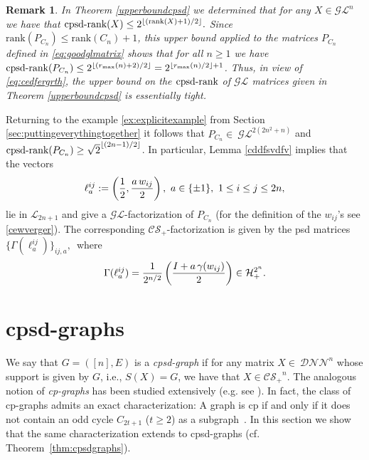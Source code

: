 \documentclass{siamart}
\newtheorem{remark}{Remark}[section]
\begin{document}
\begin{remark}\label{rem:tightlowerbound}
In Theorem
\ref{upperboundcpsd} we determined that for any $X\in {\mathcal{GL}}^n$ we have that
$ {\mathrm{cpsd}\textnormal{-rank}}(X)\le 2^{\lfloor ({\mathrm{rank}}(X)+1)/2\rfloor}.$ Since {${\mathrm{rank}}(P_{C_n})\le {\mathrm{rank}}(C_n) + 1  $}, this upper bound applied to the matrices $P_{C_n}$ defined in  \eqref{eq:goodglmatrix} shows that  for all $n\ge 1$ we have $  {\mathrm{cpsd}\textnormal{-rank}}(P_{C_n})\le {2^{\lfloor ({r_{\max}}(n)+2)/2\rfloor} = 2^{\lfloor {r_{\max}}(n)/2\rfloor + 1}}$.
Thus, in view of \eqref{eq:cedfergrth}, the upper bound on the ${\mathrm{cpsd}\textnormal{-rank}}$ of ${\mathcal{GL}}$ matrices given in Theorem \ref{upperboundcpsd} is essentially tight.
\end{remark}
\medskip

Returning  to the example \eqref{ex:explicitexample} from  Section \ref{sec:puttingeverythingtogether} it follows that  $P_{C_n}\in~{\mathcal{GL}}^{2(2n^2+n)}$ and   ${\mathrm{cpsd}\textnormal{-rank}}(P_{C_n})\ge {\sqrt{2}^{\lfloor (2n-1)/2 \rfloor}}$.
In particular, Lemma \ref{cddfsvdfv} implies that  the vectors
$$\ell^{ij}_a:=\left({1\over 2},{a \, w_{ij}\over 2}\right), \ a\in \{\pm 1\}, \ 1\le i\le j\le 2n,$$
lie in ${\mathcal{L}}_{2n+1}$ and  give a ${\mathcal{GL}}$-factorization  of $P_{C_n}$ (for the definition of the $w_{ij}$'s see \eqref{cewverger}).  The corresponding ${\mathcal{CS}_+}$-factorization is given by  the
{psd} matrices $\{\Gamma(\ell^{ij}_a)\}_{ij,a},$~{where}
$$\Gamma{(\ell^{ij}_a)}={1\over 2^{n/2}}\left ({I + a \, \gamma(w_{ij})\over 2}\right)\in {\mathcal{H}}_+^{2^n}.$$

\section{cpsd-graphs}\label{sec:cpsdgraphs}

We say that  $G=([n],E)
$  is  a  {\em cpsd-graph}   if for any matrix $X\in~{\mathcal{DNN}}^n$ whose support is given by $G$, i.e.,  $ S(X)=G$, we have  that  $ X\in {\mathcal{CS}_+}^n.$
The analogous notion of   {\em cp-graphs}  has been   studied extensively (e.g. see \cite[Section~2.5]{CP}).
In fact, the class of cp-graphs admits an exact characterization: A graph is cp  if and only if  it does not contain an odd cycle $C_{2t+1}$ ($t\ge 2$)  as a subgraph~\cite{KB}. In this section  we show that  the same characterization extends to  {cpsd-graphs} (cf. Theorem~\ref{thm:cpsdgraphs}).
\end{document}

